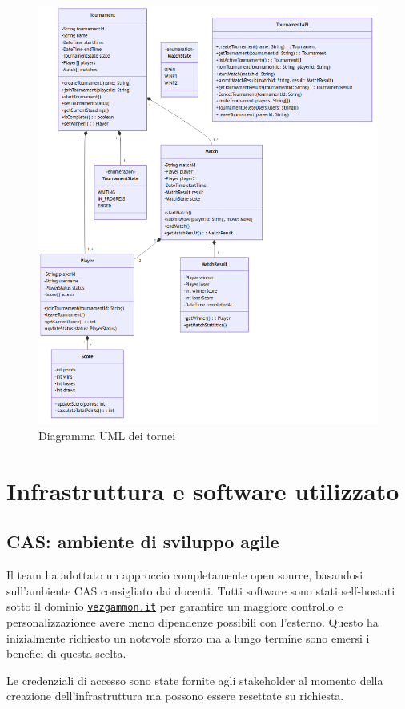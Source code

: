 \documentclass{article}
\begin{document}
\begin{figure}[H]
    \centering
    \includegraphics[width=12cm]{uml-tournaments}
    \caption{Diagramma UML dei tornei}
    \label{fig:tournaments}
\end{figure}

\section{Infrastruttura e software utilizzato}

\subsection{CAS: ambiente di sviluppo agile}

Il team ha adottato un approccio completamente open source, basandosi sull'ambiente CAS consigliato dai docenti. 
Tutti software sono stati self-hostati sotto il dominio \href{https://vezgammon.it}{\texttt{vezgammon.it}} per garantire 
un maggiore controllo e personalizzazionee avere meno dipendenze possibili con l'esterno. Questo ha inizialmente richiesto 
un notevole sforzo ma a lungo termine sono emersi i benefici di questa scelta.

Le credenziali di accesso sono state fornite agli stakeholder al momento della creazione dell'infrastruttura ma possono 
essere resettate su richiesta.
\end{document}
